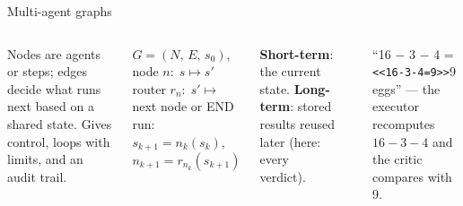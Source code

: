 \documentclass[aspectratio=169,11pt]{beamer}
\begin{document}
\begin{frame}{Multi-agent graphs}
\begin{columns}[T]
\begin{bdef}
Nodes are agents or steps; edges decide what runs next based on a shared state. Gives control, loops with limits, and an audit trail.
\end{bdef}
\begin{bmath}
$G=(N,\,E,\,s_0)$, \; node $n:\;s\mapsto s'$\\
router $r_n:\;s'\mapsto$ next node or END\\
run: $s_{k+1}=n_k(s_k)$, \; $n_{k+1}=r_{n_k}(s_{k+1})$
\end{bmath}
\begin{bdef}[Memory]
\textbf{Short-term}: the current state. \textbf{Long-term}: stored results reused later (here: every verdict).
\end{bdef}
\begin{center}
\end{center}
\begin{bex}
``16 $-$ 3 $-$ 4 = \texttt{<<16-3-4=9>>}9 eggs'' --- the executor recomputes $16-3-4$ and the critic compares with 9.
\end{bex}
\end{columns}
\end{frame}
\end{document}
